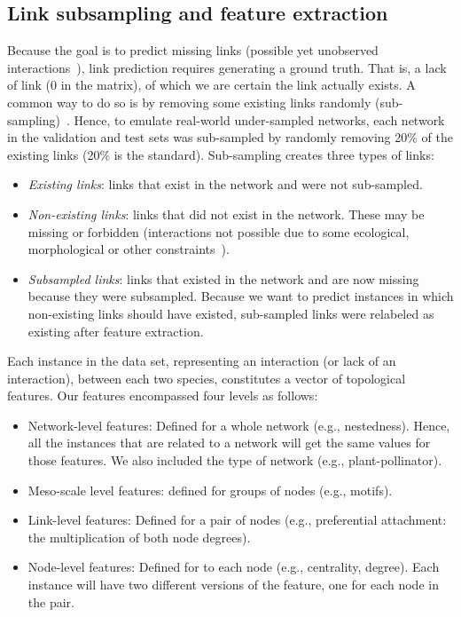 \documentclass[oneside, a4paper, onecolumn, 11pt]{article}
\begin{document}
\begin{refsection}
\subsection*{Link subsampling and feature extraction} \label{sec:features}
Because the goal is to predict missing links (possible yet unobserved interactions~\autocite{Olesen2011-rx}), link prediction requires generating a ground truth. That is, a lack of link (0 in the matrix), of which we are certain the link actually exists. A common way to do so is by removing some existing links randomly (sub-sampling)~\autocite{Lu2011-oz,Terry2020-wv}. Hence, to emulate real-world under-sampled networks, each network in the validation and test sets was sub-sampled by randomly removing 20\% of the existing links (20\% is the standard). Sub-sampling creates three types of links:
\begin{itemize}
    \item \textit{Existing links}: links that exist in the network and were not sub-sampled.
    \item \textit{Non-existing links}: links that did not exist in the network. These may be missing or forbidden (interactions not possible due to some ecological, morphological or other constraints~\autocite{Olesen2011-rx}).
    \item \textit{Subsampled links}: links that existed in the network and are now missing because they were subsampled. Because we want to predict instances in which non-existing links should have existed, sub-sampled links were relabeled as existing after feature extraction.
\end{itemize}

Each instance in the data set, representing an interaction (or lack of an interaction), between each two species, constitutes a vector of topological features. Our features encompassed four levels as follows:
\begin{itemize}
    \item Network-level features: Defined for a whole network (e.g., nestedness). Hence, all the instances that are related to a network will get the same values for those features. We also included the type of network (e.g., plant-pollinator).
    \item Meso-scale level features: defined for groups of nodes (e.g., motifs).
    \item Link-level features: Defined for a pair of nodes (e.g., preferential attachment: the multiplication of both node degrees).
    \item Node-level features: Defined for to each node (e.g., centrality, degree). Each instance will have two different versions of the feature, one for each node in the pair.
\end{itemize}


\end{refsection}
\end{document}
